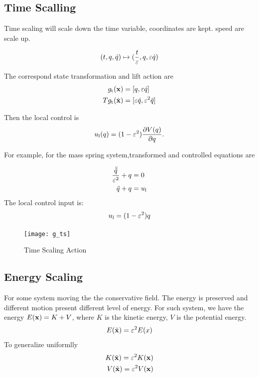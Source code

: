 \subsection*{Time Scalling}

Time scaling will scale down the time variable, coordinates are kept. speed are scale up.

\[
(t,q,\dot{q}) \mapsto (\frac{t}{\varepsilon},q,\varepsilon \dot{q})
\]

The correspond state transformation and lift action are
\begin{align}
g_{\mathrm{t}}(\mathbf{x})&=[q,\varepsilon \dot{q}] \nonumber \\
Tg_{\mathrm{t}}(\dot{\mathbf{x}})&=[\varepsilon \dot{q},\varepsilon^2 \ddot{q}]\nonumber
\end{align}

Then the local control is 
\begin{equation}
u_{\mathrm{l}}(q) = (1-\varepsilon^2) \frac{\partial V(q)}{\partial q}.
\end{equation}

For example, for the mass spring system,transformed and controlled equations are

\begin{align}
\frac{\ddot{\tilde{q}}}{\varepsilon^2}+q&=0 \nonumber \\
\ddot{q}+q&=u_{\mathrm{l}} \nonumber
\end{align}
The local control input is:
\[
u_{\mathrm{l}}=(1-\varepsilon^2)q
\]

\begin{figure}[!htbp]
  \begin{center}
    \texttt{[image: g\_ts]}
	 \caption{Time Scaling Action}
    \label{fig:gts}
\end{center}
\end{figure}


\subsection*{Energy Scaling}
For some system moving the the conservative field.
The energy is preserved and different motion present different level of energy.
For such system, we have the energy $E(\mathbf{x})=K+V$, where $K$ is the kinetic energy,
$V$ is the potential energy.
\[
E(\tilde{\mathbf{x}})=\varepsilon^2 E(x)
\]
To generalize uniformlly
\begin{align}
K(\tilde{\mathbf{x}})=\varepsilon^2 K(\mathbf{x}) \nonumber\\
V(\tilde{\mathbf{x}})=\varepsilon^2 V(\mathbf{x}) \nonumber
\end{align}


